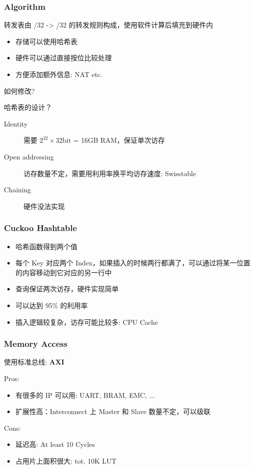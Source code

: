\documentclass[UTF-8]{ctexbeamer}
\begin{document}
\begin{frame}
  \frametitle{Algorithm}

  转发表由 /32 -> /32 的转发规则构成，使用软件计算后填充到硬件内

  \begin{itemize}
    \item 存储可以使用哈希表
    \item 硬件可以通过直接按位比较处理
    \item 方便添加额外信息: NAT etc.
  \end{itemize}

  \pause
  \vspace{1em}

  如何修改?

  \pause
  
  \vspace{1em}

  哈希表的设计？
  \begin{description}
    \item[Identity] 需要 $2^{32} \times 32\text{bit}$ = 16GB RAM，保证单次访存
    \item[Open addressing] 访存数量不定，需要用利用率换平均访存速度: Swisstable
    \item[Chaining] 硬件没法实现
  \end{description}
\end{frame}
\begin{frame}
  \frametitle{Cuckoo Hashtable}

  \begin{itemize}
    \item 哈希函数得到两个值
    \item 每个 Key 对应两个 Index，如果插入的时候两行都满了，可以通过将某一位置的内容移动到它对应的另一行中
    \item 查询保证两次访存，硬件实现简单
    \item 可以达到 95\% 的利用率
    \item 插入逻辑较复杂，访存可能比较多: CPU Cache
  \end{itemize}
\end{frame}

\begin{frame}
  \frametitle{Memory Access}

  使用标准总线: \textbf{AXI}
  
  \pause

  \vspace{1em}
  Pros:

  \begin{itemize}
    \item 有很多的 IP 可以用: UART, BRAM, EMC, ...
    \item 扩展性高：Interconnect 上 Master 和 Slave 数量不定，可以级联
  \end{itemize}

  \vspace{1em}
  Cons:
  \begin{itemize}
    \item 延迟高: At least 10 Cycles
    \item 占用片上面积很大: tot. 10K LUT
  \end{itemize}
\end{frame}
\end{document}
